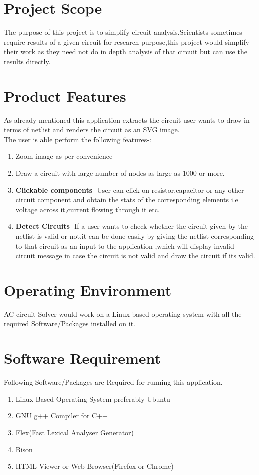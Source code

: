 \documentclass[12pt]{extarticle}
\begin{document}
\section{Project Scope}
The purpose of this project is to simplify circuit analysis.Scientists sometimes require results of a given circuit for research purpose,this project would simplify their work as they need not do in depth analysis of that circuit but can use the results directly.
\section{Product Features}
As already mentioned this application extracts the circuit user wants to draw in terms of netlist and renders the circuit as an SVG image.\\ The user is able perform the following features-:
\begin{enumerate}
\item Zoom image as per convenience
\item Draw a circuit with large number  of nodes as large as 1000 or more.
\item \textbf{Clickable components}- User can click on resistor,capacitor or any other circuit component and obtain the stats of the corresponding elements i.e voltage across it,current flowing through it etc.
\item \textbf{Detect Circuits}- If a user wants to check whether the circuit given by the netlist is valid or not,it can be done easily by giving the netlist corresponding  to that circuit as an input to the application ,which will display invalid circuit message in case the circuit is not valid and draw the circuit if its valid. 
\end{enumerate}
\section{Operating Environment}
AC circuit Solver would work on a Linux based operating system with all the required Software/Packages installed on it.
\newpage
\section{Software Requirement}
Following Software/Packages are Required for running this application.
\begin{enumerate}
\item Linux Based Operating System preferably Ubuntu
\item GNU g++ Compiler for C++
\item Flex(Fast Lexical Analyser Generator)
\item Bison
\item HTML Viewer or Web Browser(Firefox or Chrome)
\end{enumerate}
\end{document}
